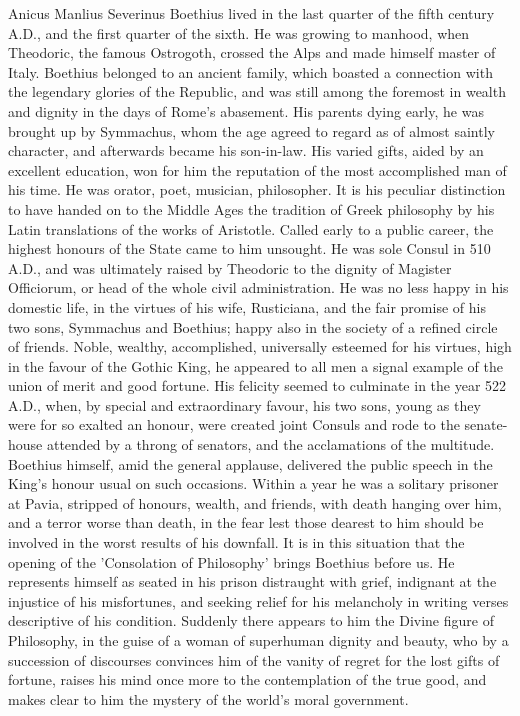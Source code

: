 
Anicus Manlius Severinus Boethius lived in the last quarter of the fifth
century A.D., and the first quarter of the sixth. He was growing to
manhood, when Theodoric, the famous Ostrogoth, crossed the Alps and made
himself master of Italy. Boethius belonged to an ancient family, which
boasted a connection with the legendary glories of the Republic, and was
still among the foremost in wealth and dignity in the days of Rome's
abasement. His parents dying early, he was brought up by Symmachus, whom
the age agreed to regard as of almost saintly character, and afterwards
became his son-in-law. His varied gifts, aided by an excellent
education, won for him the reputation of the most accomplished man of
his time. He was orator, poet, musician, philosopher. It is his peculiar
distinction to have handed on to the Middle Ages the tradition of Greek
philosophy by his Latin translations of the works of Aristotle. Called
early to a public career, the highest honours of the State came to him
unsought. He was sole Consul in 510 A.D., and was ultimately raised by
Theodoric to the dignity of Magister Officiorum, or head of the whole
civil administration. He was no less happy in his domestic life, in the
virtues of his wife, Rusticiana, and the fair promise of his two sons,
Symmachus and Boethius; happy also in the society of a refined circle of
friends. Noble, wealthy, accomplished, universally esteemed for his
virtues, high in the favour of the Gothic King, he appeared to all men a
signal example of the union of merit and good fortune. His felicity
seemed to culminate in the year 522 A.D., when, by special and
extraordinary favour, his two sons, young as they were for so exalted an
honour, were created joint Consuls and rode to the senate-house
attended by a throng of senators, and the acclamations of the multitude.
Boethius himself, amid the general applause, delivered the public speech
in the King's honour usual on such occasions. Within a year he was a
solitary prisoner at Pavia, stripped of honours, wealth, and friends,
with death hanging over him, and a terror worse than death, in the fear
lest those dearest to him should be involved in the worst results of his
downfall. It is in this situation that the opening of the 'Consolation
of Philosophy' brings Boethius before us. He represents himself as
seated in his prison distraught with grief, indignant at the injustice
of his misfortunes, and seeking relief for his melancholy in writing
verses descriptive of his condition. Suddenly there appears to him the
Divine figure of Philosophy, in the guise of a woman of superhuman
dignity and beauty, who by a succession of discourses convinces him of
the vanity of regret for the lost gifts of fortune, raises his mind once
more to the contemplation of the true good, and makes clear to him the
mystery of the world's moral government.

